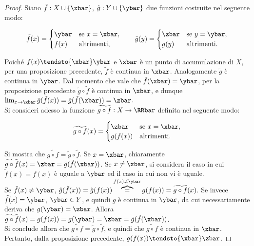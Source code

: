 \documentclass[11pt]{article}
\begin{document}
	\begin{proof}
		Siano $\tilde{f} : X \cup \{\xbar\}$, $\tilde{g} : Y \cup \{\ybar\}$ due funzioni costruite nel seguente
		modo:
		
		\[ \tilde{f}(x) = \begin{cases}
			\ybar & \text{se } x = \xbar, \\
			f(x) & \text{altrimenti},
		\end{cases} \qquad
			\tilde{g}(y) = \begin{cases}
				\zbar & \text{se } y = \ybar, \\
				g(y) & \text{altrimenti}.
			\end{cases} \]
		
		Poiché $f(x) \tendsto{\xbar} \ybar$ e $\xbar$ è un punto di accumulazione di $X$, per una proposizione precedente, $\tilde{f}$ è continua in $\xbar$. Analogamente $\tilde{g}$ è continua in $\ybar$. Dal momento che
		vale che $\tilde{f}(\xbar) = \ybar$, per la proposizione precedente $\tilde{g} \circ \tilde{f}$ è continua in
		$\xbar$, e dunque $\lim_{x \to \xbar} \tilde{g}(\tilde{f}(x)) = \tilde{g}(\tilde{f}(\xbar)) = \zbar$. \\
		
		Si consideri adesso la funzione $\widetilde{g \circ f} : X \to \RRbar$ definita nel seguente modo:
		
		\[ \widetilde{g \circ f}(x) = \begin{cases}
			\zbar & \text{se } x = \xbar, \\
			g(f(x)) & \text{altrimenti}.
		\end{cases} \]
	
		Si mostra che $\widetilde{g \circ f} = \tilde{g} \circ \tilde{f}$. Se $x = \xbar$, chiaramente
		$\widetilde{g \circ f}(x) = \zbar = \tilde{g}(\tilde{f}(\xbar))$. Se $x \neq \xbar$, si
		considera il caso in cui $\tilde{f}(x) = f(x)$ è uguale a $\ybar$ ed il caso in cui non vi è
		uguale. \\
		
		Se $\tilde{f}(x) \neq \ybar$, $\tilde{g}(\tilde{f}(x)) = \tilde{g}(f(x)) \overbrace{=}^{f(x) \neq \ybar} g(f(x)) = \widetilde{g \circ f}(x)$. Se invece
		$\tilde{f}(x) = \ybar$, $\ybar \in Y$, e quindi $g$ è continua in $\ybar$, da cui necessariamente
		deriva che $g(\ybar) = \zbar$. Allora $\widetilde{g \circ f}(x) = g(f(x)) = g(\ybar) = \zbar = \tilde{g}(\tilde{f}(\xbar))$. \\ 
		
		Si conclude allora che $\widetilde{g \circ f} = \tilde{g} \circ \tilde{f}$, e
		quindi che $\widetilde{g \circ f}$ è continua in $\xbar$. Pertanto,
		dalla proposizione precedente, $g(f(x)) \tendsto{\xbar} \zbar$.
	\end{proof}
\end{document}
